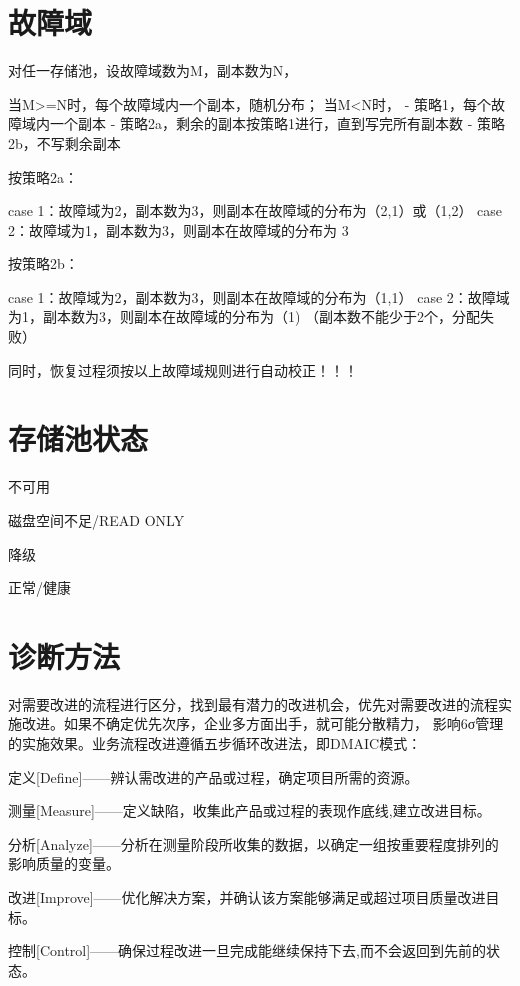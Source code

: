 \section{故障域}

对任一存储池，设故障域数为M，副本数为N，

当M>=N时，每个故障域内一个副本，随机分布；
当M<N时，
- 策略1，每个故障域内一个副本
- 策略2a，剩余的副本按策略1进行，直到写完所有副本数
- 策略2b，不写剩余副本

按策略2a：

case 1：故障域为2，副本数为3，则副本在故障域的分布为（2,1）或（1,2）
case 2：故障域为1，副本数为3，则副本在故障域的分布为 3

按策略2b：

case 1：故障域为2，副本数为3，则副本在故障域的分布为（1,1）
case 2：故障域为1，副本数为3，则副本在故障域的分布为（1) （副本数不能少于2个，分配失败）

同时，恢复过程须按以上故障域规则进行自动校正！！！

\section{存储池状态}

\begin{compactenum}
\item 不可用
\item 磁盘空间不足/READ ONLY
\item 降级
\item 正常/健康
\end{compactenum}

\section{诊断方法}

对需要改进的流程进行区分，找到最有潜力的改进机会，优先对需要改进的流程实施改进。如果不确定优先次序，企业多方面出手，就可能分散精力，
影响6σ管理的实施效果。业务流程改进遵循五步循环改进法，即DMAIC模式：

\begin{compactenum}
\item 定义[Define]——辨认需改进的产品或过程，确定项目所需的资源。
\item 测量[Measure]——定义缺陷，收集此产品或过程的表现作底线,建立改进目标。
\item 分析[Analyze]——分析在测量阶段所收集的数据，以确定一组按重要程度排列的影响质量的变量。
\item 改进[Improve]——优化解决方案，并确认该方案能够满足或超过项目质量改进目标。
\item 控制[Control]——确保过程改进一旦完成能继续保持下去,而不会返回到先前的状态。
\end{compactenum}

